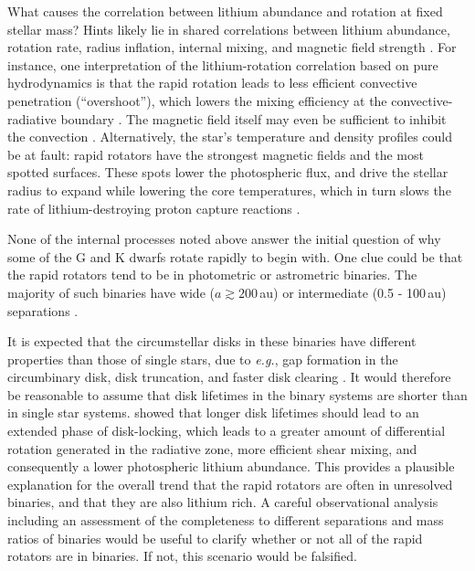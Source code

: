 \documentclass[12pt,twocolumn,tighten]{aastex63}
\begin{document}
What causes the correlation between lithium abundance and rotation at
fixed stellar mass?  Hints likely lie in shared correlations between lithium
abundance, rotation rate, radius inflation, internal mixing, and
magnetic field strength
\citep{chabrier_evolution_2007,somers_measurement_2017,jeffries_m35_li_2020}.
For instance, one interpretation of the lithium-rotation correlation
based on pure hydrodynamics is that the rapid rotation leads to less
efficient convective penetration (``overshoot''), which lowers the mixing
efficiency at the convective-radiative boundary
\citep{baraffe_lithium_2017}.  The magnetic field itself may even be
sufficient to inhibit the convection \citep{ventura_Li_B_1998}.
Alternatively, the star's temperature and density profiles could be at fault: rapid rotators
have the strongest magnetic fields and the most spotted surfaces.
These spots lower the photospheric flux, and drive the stellar radius
to expand while lowering the core temperatures, which in turn slows
the rate of lithium-destroying proton capture reactions
\citep{feiden_magnetic_2013,somers_rotation_2015}.  

None of the internal processes noted above answer the initial
question of why some of the G and K dwarfs rotate rapidly to begin
with.  One clue could be that the rapid rotators tend to be in
photometric or astrometric binaries.  The majority of such binaries
have wide ($a\gtrsim200$\,au) or intermediate (0.5 - 100\,au)
separations \citep{raghavan_survey_2010}.

It is expected that the circumstellar disks in these binaries have
different properties than those of single stars, due to {\it e.g.}, gap
formation in the circumbinary disk, disk truncation, and faster disk
clearing \citep{artymowicz_dynamics_1994,moe_impact_2020}.  It would
therefore be reasonable to assume that disk lifetimes in the binary
systems are shorter than in single star systems.
\citet{eggenberger_impact_2012} showed that longer disk lifetimes
should lead to an extended phase of disk-locking, which leads to a
greater amount of differential rotation generated in the radiative
zone, more efficient shear mixing, and consequently a lower photospheric
lithium abundance.  This provides a plausible explanation for the
overall trend that the rapid rotators are often in unresolved
binaries, and that they are also lithium rich.  A careful
observational analysis including an assessment of the completeness to
different separations and mass ratios of binaries would be useful to
clarify whether or not all of the rapid rotators are in binaries.  If
not, this scenario would be falsified.
\end{document}
